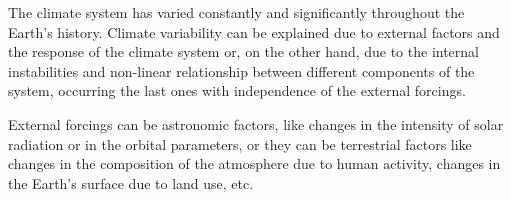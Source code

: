The climate system has varied constantly and significantly throughout the Earth's history. Climate variability can be explained due to external factors and the response of the climate system or, on the other hand, due to the internal instabilities and non-linear relationship between different components of the system, occurring the last ones with independence of the external forcings.


External forcings can be astronomic factors, like changes in the intensity of solar radiation or in the orbital parameters, or they can be terrestrial factors like changes in the composition of the atmosphere due to human activity, changes in the Earth's surface due to land use, etc.




